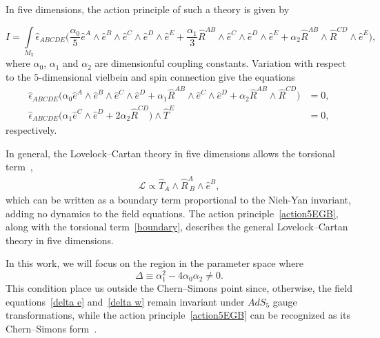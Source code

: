 \documentclass[aps,prd,12pt,superscriptaddress,showpacs,showkeys,longbibliography,reprint,nofootinbib]{revtex4-1}
\begin{document}
In five dimensions, the action principle of such a theory is given by  
\begin{widetext}
  \begin{equation}\label{action5EGB}
    I=\int\limits_{M_5}\hat{\epsilon}_{ABCDE}\Big(\frac{\alpha_0}{5}\hat{e}^A\wedge\hat{e}^B\wedge\hat{e}^C\wedge
    \hat{e}^D\wedge\hat{e}^E
    +\frac{\alpha_1}{3}\hat{R}^{AB}\wedge\hat{e}^C\wedge\hat{e}^D\wedge\hat{e}^E
    +\alpha_2\hat{R}^{AB}\wedge\hat{R}^{CD}
    \wedge\hat{e}^E\Big),
  \end{equation}
where $\alpha_0$, $\alpha_1$ and $\alpha_2$ are dimensionful coupling constants. Variation with respect to the $5$-dimensional vielbein and spin connection give the equations
  \begin{align}\label{delta e}
    \hat{\epsilon}_{ABCDE}\Big(\alpha_0\hat{e}^A\wedge\hat{e}^B\wedge\hat{e}^C\wedge\hat{e}^D
    +\alpha_1\hat{R}^{AB}\wedge\hat{e}^C\wedge\hat{e}^D
    +\alpha_2\hat{R}^{AB}\wedge\hat{R}^{CD}\Big)&=0,
    \\\label{delta w}
    \hat{\epsilon}_{ABCDE}\Big(\alpha_1\hat{e}^C\wedge\hat{e}^D+
    2\alpha_2\hat{R}^{CD}\Big)\wedge\hat{T}^E&=0,
  \end{align}
respectively.
\end{widetext}

In general, the Lovelock--Cartan theory in five dimensions allows the torsional term~\cite{Mardones:1990qc},
\begin{align}
\label{boundary}
\mathcal{L} \propto \hat{T}_A\wedge \hat{R}^A_{\ B}\wedge\hat{e}^B,
\end{align}
which can be written as a boundary term proportional to the Nieh-Yan invariant, adding no dynamics to the field equations. The action principle~\eqref{action5EGB}, along with the torsional term~\eqref{boundary}, describes the general Lovelock--Cartan theory in five dimensions.

In this work, we will focus on the region in the parameter space where
\begin{equation}\label{delta}
\Delta\equiv\alpha_1^2-4\alpha_0\alpha_2\neq 0.
\end{equation}
This condition place us outside the Chern--Simons point since, otherwise, the field equations~\eqref{delta e} and~\eqref{delta w} remain invariant under $AdS_5$ gauge transformations, while the action principle~\eqref{action5EGB} can be recognized as its Chern--Simons form~\cite{Zanelli:2005sa,Troncoso:1999pk}. 
\end{document}

